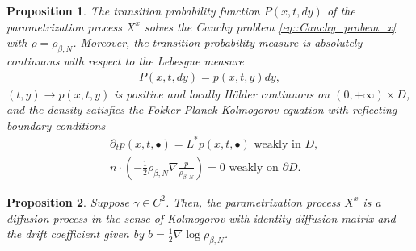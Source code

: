 \documentclass[10pt,a4paper]{amsart}
\newtheorem{proposition}{Proposition}
\begin{document}
\begin{proposition}\label{prop::FPK_X_process}
The transition probability function $P(x,t,dy)$ of the parametrization process $X^{x}$ solves the Cauchy problem \eqref{eq::Cauchy_probem_x} with $\rho=\rho_{\beta, N}$. Moreover, the transition probability measure is absolutely continuous with respect to the Lebesgue measure 
\begin{align*}
    P(x,t,dy) = p(x,t,y)dy,
\end{align*}
$(t,y)\to p(x,t,y)$ is positive and locally Hölder continuous on $(0,+\infty)\times D$, and the density satisfies the Fokker-Planck-Kolmogorov equation with reflecting boundary conditions
\begin{align*}
    &\partial_{t}p(x,t,\bullet)=L^{*}p(x,t,\bullet) \text{ weakly in }D,\\
    &n\cdot\left(-\frac{1}{2}\rho_{\beta, N}\nabla \frac{p}{\rho_{\beta, N}} \right) = 0 \text{ weakly on }\partial D.
\end{align*}
\end{proposition}

\begin{proposition}\label{prop::Kolmogorov_diffusion}
Suppose $\gamma \in C^{2}$.
Then, the parametrization process $X^{x}$ is a diffusion process in the sense of Kolmogorov with identity diffusion matrix and the drift coefficient given by $b =\frac{1}{2}\nabla\log\rho_{\beta, N}$.   
\end{proposition}
\end{document}
